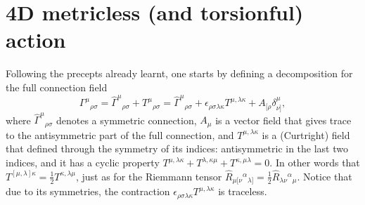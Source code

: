 \documentclass[%
  showpacs,showkeys,prd,superscriptaddress]{revtex4-1}
\begin{document}

\section{4D metricless (and torsionful) action}

Following the precepts  already learnt, one starts  by defining a decomposition for the full connection field 
\begin{equation}
  \Gamma^\mu{}_{\rho\sigma} = \hat{\Gamma}^\mu{}_{\rho\sigma} + T^\mu{}_{\rho\sigma} = \hat{\Gamma}^\mu{}_{\rho\sigma} + \epsilon_{\rho\sigma\lambda\kappa}T^{\mu,\lambda\kappa}+A_{[\rho}\delta^\mu_{\nu]},
\end{equation}
where $\hat{\Gamma}^\mu{}_{\rho\sigma}$ denotes a symmetric connection, $A_\mu$ is a vector field  that gives trace to the antisymmetric part of the full connection, and  $T^{\mu,\lambda\kappa}$ is a (Curtright) field that  defined through the symmetry of its indices: antisymmetric in the last two indices, and it has a cyclic property $T^{\mu,\lambda\kappa}+T^{\lambda,\kappa\mu}+T^{\kappa,\mu\lambda}=0$. In other words that $T^{[\mu,\lambda]\kappa}=\frac{1}{2}T^{\kappa,\lambda\mu}$, just as for  the Riemmann tensor $\hat{R}_{\mu[\nu}{}^\alpha{}_{\lambda]}=\frac{1}{2}\hat{R}_{\lambda\nu}{}^\alpha{}_{\mu}$. Notice that due to its symmetries, the contraction $\epsilon_{\rho\sigma\lambda\kappa}T^{\mu,\lambda\kappa}$ is traceless. 
\end{document}
